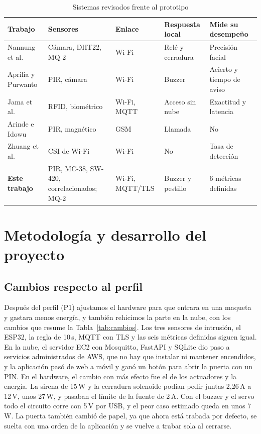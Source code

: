 \documentclass[manuscript,screen,nonacm]{acmart}
\begin{document}
\begin{table}[htbp]
\centering
\caption{Sistemas revisados frente al prototipo}
\label{tab:comparacion}
\footnotesize
\renewcommand{\arraystretch}{1.2}
\begin{tabular}{@{}L{2.5cm}L{3.1cm}L{1.8cm}L{2.7cm}L{2.8cm}@{}}
\toprule
\textbf{Trabajo} & \textbf{Sensores} & \textbf{Enlace} & \textbf{Respuesta local} & \textbf{Mide su desempeño} \\
\midrule
Nannung et al. \cite{nannung2025iot} & Cámara, DHT22, MQ-2 & Wi-Fi & Relé y cerradura & Precisión facial \\
Aprilia y Purwanto \cite{aprilia2025boarding} & PIR, cámara & Wi-Fi & Buzzer & Acierto y tiempo de aviso \\
Jama et al. \cite{jama2026edge} & RFID, biométrico & Wi-Fi, MQTT & Acceso sin nube & Exactitud y latencia \\
Arinde e Idowu \cite{arinde2024multisensor} & PIR, magnético & GSM & Llamada & No \\
Zhuang et al. \cite{zhuang2021intrusion} & CSI de Wi-Fi & Wi-Fi & No & Tasa de detección \\
\midrule
\textbf{Este trabajo} & PIR, MC-38, SW-420, correlacionados; MQ-2 & Wi-Fi, MQTT/TLS & Buzzer y pestillo & 6 métricas definidas \\
\bottomrule
\end{tabular}
\end{table}

\section{Metodología y desarrollo del proyecto}
\label{sec:metodologia}

\subsection{Cambios respecto al perfil}
Después del perfil (P1) ajustamos el hardware para que entrara en una maqueta y gastara menos energía, y también rehicimos la parte en la nube, con los cambios que resume la Tabla~\ref{tab:cambios}. Los tres sensores de intrusión, el ESP32, la regla de 10\,s, MQTT con TLS y las seis métricas definidas siguen igual. En la nube, el servidor EC2 con Mosquitto, FastAPI y SQLite dio paso a servicios administrados de AWS, que no hay que instalar ni mantener encendidos, y la aplicación pasó de web a móvil y ganó un botón para abrir la puerta con un PIN. En el hardware, el cambio con más efecto fue el de los actuadores y la energía. La sirena de 15\,W y la cerradura solenoide podían pedir juntas 2,26\,A a 12\,V, unos 27\,W, y pasaban el límite de la fuente de 2\,A. Con el buzzer y el servo todo el circuito corre con 5\,V por USB, y el peor caso estimado queda en unos 7\,W. La puerta también cambió de papel, ya que ahora está trabada por defecto, se suelta con una orden de la aplicación y se vuelve a trabar sola al cerrarse.
\end{document}
